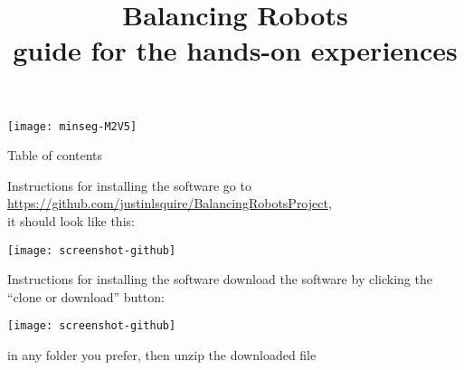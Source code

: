 \newif	\ifexternalize					%
\newif	\ifshowonlynotes				%
\newif	\ifhandout						%
\newif	\ifshowsolutions				%
\newif	\ifshownotes					%
\ifdefined\EXTERNALIZE	\externalizetrue	\fi						%
\ifdefined\ONLYNOTES	\showonlynotestrue	\fi						%
\ifdefined\HANDOUT		\handouttrue		\fi						%
\ifdefined\SOLUTIONS	\showsolutionstrue	\fi						%
\ifdefined\NOTES		\shownotestrue		\fi						%
\title		[Balancing Robots]	{Balancing Robots \\ guide for the hands-on experiences}
\date		{} %


\begin{frame}
	\titlepage
	\vspace{-1.9cm} 
	\begin{center}
		\texttt{[image: minseg-M2V5]}
	\end{center}
\end{frame}


\begin{frame}{Table of contents}
	\tableofcontents
\end{frame}




\begin{frame}[t]{Instructions for installing the software}
	go to \url{https://github.com/justinlsquire/BalancingRobotsProject}, \\ it should look like this:
	\begin{center}
		\texttt{[image: screenshot-github]}
	\end{center}
\end{frame}


\begin{frame}[t]{Instructions for installing the software}
	download the software by clicking the ``clone or download'' button:
	\begin{center}
		\texttt{[image: screenshot-github]}
	\end{center}
	in any folder you prefer, then unzip the downloaded file
\end{frame}


